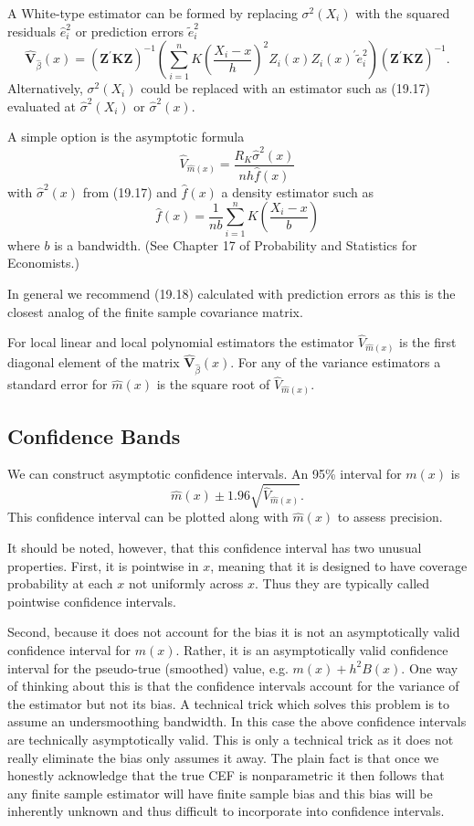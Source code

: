 \documentclass[10pt]{article}
\begin{document}
A White-type estimator can be formed by replacing $\sigma^{2}\left(X_{i}\right)$ with the squared residuals $\widehat{e}_{i}^{2}$ or prediction errors $\widetilde{e}_{i}^{2}$
$$
\widehat{\boldsymbol{V}}_{\widehat{\beta}}(x)=\left(\boldsymbol{Z}^{\prime} \boldsymbol{K} \boldsymbol{Z}\right)^{-1}\left(\sum_{i=1}^{n} K\left(\frac{X_{i}-x}{h}\right)^{2} Z_{i}(x) Z_{i}(x)^{\prime} \widetilde{e}_{i}^{2}\right)\left(\boldsymbol{Z}^{\prime} \boldsymbol{K} \boldsymbol{Z}\right)^{-1} .
$$
Alternatively, $\sigma^{2}\left(X_{i}\right)$ could be replaced with an estimator such as (19.17) evaluated at $\widehat{\sigma}^{2}\left(X_{i}\right)$ or $\widehat{\sigma}^{2}(x)$.

A simple option is the asymptotic formula
$$
\widehat{V}_{\widehat{m}(x)}=\frac{R_{K} \widehat{\sigma}^{2}(x)}{n h \widehat{f}(x)}
$$
with $\widehat{\sigma}^{2}(x)$ from (19.17) and $\widehat{f}(x)$ a density estimator such as
$$
\widehat{f}(x)=\frac{1}{n b} \sum_{i=1}^{n} K\left(\frac{X_{i}-x}{b}\right)
$$
where $b$ is a bandwidth. (See Chapter 17 of Probability and Statistics for Economists.)

In general we recommend (19.18) calculated with prediction errors as this is the closest analog of the finite sample covariance matrix.

For local linear and local polynomial estimators the estimator $\widehat{V}_{\widehat{m}(x)}$ is the first diagonal element of the matrix $\widehat{\boldsymbol{V}}_{\widehat{\beta}}(x)$. For any of the variance estimators a standard error for $\widehat{m}(x)$ is the square root of $\widehat{V}_{\widehat{m}(x)}$.

\subsection{Confidence Bands}
We can construct asymptotic confidence intervals. An 95\% interval for $m(x)$ is
$$
\widehat{m}(x) \pm 1.96 \sqrt{\widehat{V}_{\widehat{m}(x)}} .
$$
This confidence interval can be plotted along with $\widehat{m}(x)$ to assess precision.

It should be noted, however, that this confidence interval has two unusual properties. First, it is pointwise in $x$, meaning that it is designed to have coverage probability at each $x$ not uniformly across $x$. Thus they are typically called pointwise confidence intervals.

Second, because it does not account for the bias it is not an asymptotically valid confidence interval for $m(x)$. Rather, it is an asymptotically valid confidence interval for the pseudo-true (smoothed) value, e.g. $m(x)+h^{2} B(x)$. One way of thinking about this is that the confidence intervals account for the variance of the estimator but not its bias. A technical trick which solves this problem is to assume an undersmoothing bandwidth. In this case the above confidence intervals are technically asymptotically valid. This is only a technical trick as it does not really eliminate the bias only assumes it away. The plain fact is that once we honestly acknowledge that the true CEF is nonparametric it then follows that any finite sample estimator will have finite sample bias and this bias will be inherently unknown and thus difficult to incorporate into confidence intervals.
\end{document}
